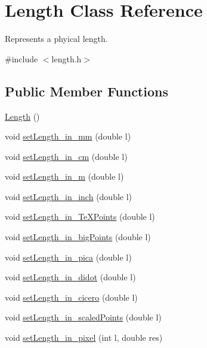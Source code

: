 \hypertarget{classLength}{\section{Length Class Reference}
\label{classLength}
}


Represents a phyical length.  




{\ttfamily \#include $<$length.\+h$>$}

\subsection*{Public Member Functions}
\begin{DoxyCompactItemize}
\item 
\hyperlink{classLength_a775ea8a0d82677aa7b5c4f88ed1c1599}{Length} ()
\item 
void \hyperlink{classLength_ae3aabced262567871a1df58c1a878b60}{set\+Length\+\_\+in\+\_\+mm} (double l)
\item 
void \hyperlink{classLength_a4ccc72a3e9be9c00a0901a0c3c31e907}{set\+Length\+\_\+in\+\_\+cm} (double l)
\item 
void \hyperlink{classLength_ae72e066fb474906318b5ceb599040497}{set\+Length\+\_\+in\+\_\+m} (double l)
\item 
void \hyperlink{classLength_af5a9d0ca3a93d6c2c304ca5ac445aa44}{set\+Length\+\_\+in\+\_\+inch} (double l)
\item 
void \hyperlink{classLength_ab498bfda0cdddc0d220dda971b650006}{set\+Length\+\_\+in\+\_\+\+Te\+X\+Points} (double l)
\item 
void \hyperlink{classLength_a7ef43fb59b11edbf216f24119c419ba7}{set\+Length\+\_\+in\+\_\+big\+Points} (double l)
\item 
void \hyperlink{classLength_a35193177ff37acd63b229eaefb3ab81a}{set\+Length\+\_\+in\+\_\+pica} (double l)
\item 
void \hyperlink{classLength_a43d6c55cc4653176eb9cda1d1c3a15d1}{set\+Length\+\_\+in\+\_\+didot} (double l)
\item 
void \hyperlink{classLength_a0e962b083f3b6b481a0a2a702386dd3b}{set\+Length\+\_\+in\+\_\+cicero} (double l)
\item 
void \hyperlink{classLength_a8d295c7c27c3734530e9dd90f4acddb1}{set\+Length\+\_\+in\+\_\+scaled\+Points} (double l)
\item 
void \hyperlink{classLength_aadf935526a018f3323a637facaed9ffa}{set\+Length\+\_\+in\+\_\+pixel} (int l, double res)
\item 

\end{DoxyCompactItemize}
